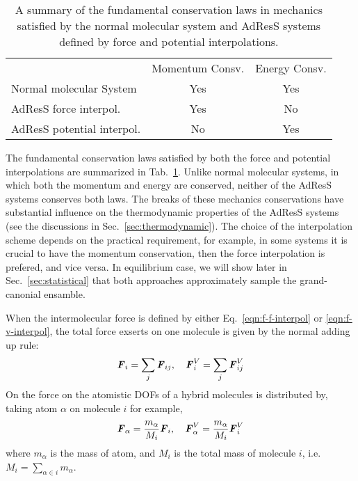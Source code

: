 \documentclass[epjST]{svjour}
\newcommand{\vect}[1]{\textbf{\textit{#1}}}
\newcommand{\moleidxone}[0]{i}
\newcommand{\moleidxtwo}[0]{j}
\newcommand{\atomidxone}[0]{\alpha}
\begin{document}
\begin{table}
  \centering
  \caption{A summary of the fundamental conservation laws in mechanics 
    satisfied by the normal molecular system and AdResS systems defined by force and potential interpolations.}
  \label{tab:conv-laws}
  \begin{tabular*}{0.8\textwidth}{@{\extracolsep{\fill}}lcc}\hline\hline
    &         Momentum Consv.     &       Energy Consv. \\
    Normal molecular System     &       {Yes}        &       {Yes}\\      
    AdResS force interpol.   &       {Yes}        &       {No}\\      
    AdResS potential interpol.  &     {No}  &       {Yes}\\\hline\hline
  \end{tabular*}
\end{table}
The fundamental conservation laws satisfied by both the force and potential interpolations
are summarized in Tab.~\ref{tab:conv-laws}. Unlike normal molecular systems, in which both
the momentum and energy are conserved, neither of the AdResS systems conserves
both laws. The breaks of these mechanics conservations have substantial influence on the thermodynamic
properties of the AdResS systems (see the discussions in Sec.~\ref{sec:thermodynamic}). The choice of the interpolation scheme depends on
the practical requirement, for example, in some systems it is crucial to have the momentum
conservation, then the force interpolation is prefered, and vice versa.
In equilibrium case, we will show later in Sec.~\ref{sec:statistical}
that both approaches approximately sample the grand-canonial ensamble.

When the intermolecular force is defined by either
Eq.~\eqref{eqn:f-f-interpol} or \eqref{eqn:f-v-interpol}, the total
force exserts on one molecule is given by the normal adding up rule:
\begin{align}
  \vect F_\moleidxone = \sum_\moleidxtwo \vect F_{\moleidxone\moleidxtwo}, \quad \vect F^V_\moleidxone = \sum_\moleidxtwo \vect F^V_{\moleidxone\moleidxtwo}
\end{align}
On the force on the atomistic DOFs of a hybrid molecules is distributed 
by, taking atom $\atomidxone$ on molecule $\moleidxone$ for example,
\begin{align}
  \vect F_\atomidxone = \frac{m_\atomidxone}{M_\moleidxone}\vect F_\moleidxone, \quad   \vect F^V_\atomidxone = \frac{m_\atomidxone}{M_\moleidxone}\vect F^V_\moleidxone 
\end{align}
where $m_\atomidxone$ is the mass of atom, and $M_\moleidxone$ is the total mass of molecule $\moleidxone$, i.e.~$M_\moleidxone = \sum_{\atomidxone\in\moleidxone}m_\atomidxone$.
\end{document}
